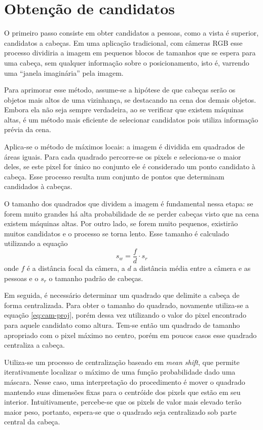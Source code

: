 \section{Obtenção de candidatos}
\label{sec:tradicional-candidatos}
O primeiro passo consiste em obter candidatos a pessoas, como a vista é superior, candidatos a cabeças. Em uma aplicação tradicional, com câmeras RGB esse processo dividiria a imagem em pequenos blocos de tamanhos que se espera para uma cabeça, sem qualquer informação sobre o posicionamento, isto é, varrendo uma ``janela imaginária'' pela imagem.

Para aprimorar esse método, assume-se a hipótese de que cabeças serão os objetos mais altos de uma vizinhança, se destacando na cena dos demais objetos. Embora ela não seja sempre verdadeira, ao se verificar que existem máquinas altas, é um método mais eficiente de selecionar candidatos pois utiliza informação prévia da cena.

Aplica-se o método de máximos locais: a imagem é dividida em quadrados de áreas iguais. Para cada quadrado percorre-se os pixels e seleciona-se o maior deles, se este pixel for único no conjunto ele é considerado um ponto candidato à cabeça. Esse processo resulta num conjunto de pontos que determinam candidados à cabeças.

O tamanho dos quadrados que dividem a imagem é fundamental nessa etapa: se forem muito grandes há alta probabilidade de se perder cabeças visto que na cena existem máquinas altas. Por outro lado, se forem muito pequenos, existirão muitos candidatos e o processo se torna lento. Esse tamanho é calculado utilizando a equação
\begin{equation}
	\label{eq:cam-proj}
	s_w = \frac{f}{d} \cdot s_r
\end{equation}
 onde $f$ é a distância focal da câmera, a $d$ a distância média entre a câmera e as pessoas e o $s_r$ o tamanho padrão de cabeças.

Em seguida, é necessário determinar um quadrado que delimite a cabeça de forma centralizada. Para obter o tamanho do quadrado, novamente utiliza-se a equação \eqref{eq:cam-proj}, porém dessa vez utilizando o valor do pixel encontrado para aquele candidato como altura. Tem-se então um quadrado de tamanho apropriado com o pixel máximo no centro, porém em poucos casos esse quadrado centraliza a cabeça.

Utiliza-se um processo de centralização baseado em \textit{mean shift}, que permite iterativamente localizar o máximo de uma função probabilidade dado uma máscara. Nesse caso, uma interpretação do procedimento é mover o quadrado mantendo suas dimensões fixas para o centróide dos pixels que estão em seu interior. Intuitivamente, percebe-se que os pixels de valor mais elevado terão maior peso, portanto, espera-se que o quadrado seja centralizado sob parte central da cabeça.


